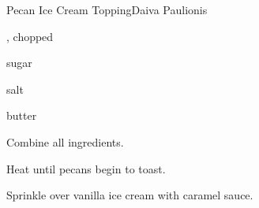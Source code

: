 \begin{recipe}{Pecan Ice Cream Topping}{Daiva Paulionis}{}

\begin{ingredients}
\item \C{\half} , chopped
\item {} sugar
\item \tp{\quarter} salt
\item {} butter
\end{ingredients}

\begin{directions}
\item Combine all ingredients.
\item Heat until pecans begin to toast.
\item Sprinkle over vanilla ice cream with caramel sauce.
\end{directions}

\end{recipe}

